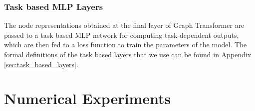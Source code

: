 \documentclass[letterpaper]{article} %
\begin{document}
\subsubsection{Task based MLP Layers} 
The node representations obtained at the final layer of Graph Transformer are passed to a task based MLP network for computing task-dependent outputs, which are then fed to a loss function to train the parameters of the model. The formal definitions of the task based layers that we use can be found in Appendix \ref{sec:task_based_layers}.





\section{Numerical Experiments}
\end{document}
